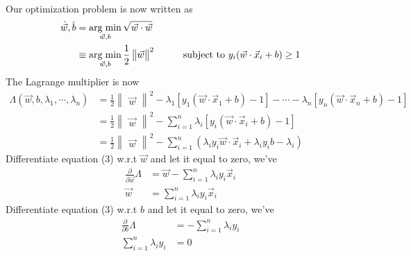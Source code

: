 \documentclass{article}
\begin{document}
\paragraph{}
Our optimization problem is now written as 
\begin{align*}
    \hat{\Vec{w}}, \hat{b} &= \operatorname*{arg \hspace{1mm} min}_{\Vec{w}, b} \sqrt{\Vec{w}\cdot\Vec{w}} \\
    &\equiv \operatorname*{arg \hspace{1mm} min}_{\Vec{w}, b} \frac{1}{2} \begin{Vmatrix} \Vec{w} \end{Vmatrix}^2 \hspace{10mm} \text{subject to } y_i(\Vec{w} \cdot \Vec{x}_i + b) \geq 1
\end{align*}
The Lagrange multiplier is now
\begin{align}
    \Lambda (\Vec{w}, b, \lambda_1, \cdots, \lambda_n) &= 
    \frac{1}{2}\begin{Vmatrix} \Vec{w} \end{Vmatrix}^2 -
    \lambda_1[y_1(\Vec{w} \cdot \Vec{x}_1 + b)-1] - \cdots -
    \lambda_n[y_n(\Vec{w} \cdot \Vec{x}_n + b)-1] \nonumber \\
    &= \frac{1}{2}\begin{Vmatrix} \Vec{w} \end{Vmatrix}^2 -
    \displaystyle\sum_{i=1}^{n} \lambda_i[y_i(\Vec{w} \cdot \Vec{x}_i + b)-1] \nonumber \\
    &= \frac{1}{2}\begin{Vmatrix} \Vec{w} \end{Vmatrix}^2 -
    \displaystyle\sum_{i=1}^{n} (\lambda_i y_i \Vec{w}\cdot\Vec{x}_i +\lambda_i y_i b - \lambda_i)
\end{align}
Differentiate equation (3) w.r.t $\Vec{w}$ and let it equal to zero, we've
\begin{align}
    \frac{\partial}{\partial\Vec{w}}\Lambda &=
    \Vec{w} - \displaystyle\sum_{i=1}^{n} \lambda_i y_i\Vec{x}_i \nonumber \\
    \Vec{w} &= \displaystyle\sum_{i=1}^{n} \lambda_i y_i\Vec{x}_i
\end{align}
Differentiate equation (3) w.r.t $b$ and let it equal to zero, we've
\begin{align}
    \frac{\partial}{\partial b}\Lambda &= - \displaystyle\sum_{i=1}^{n} \lambda_i y_i \nonumber \\
    \displaystyle\sum_{i=1}^{n} \lambda_i y_i &= 0    
\end{align}
\end{document}
